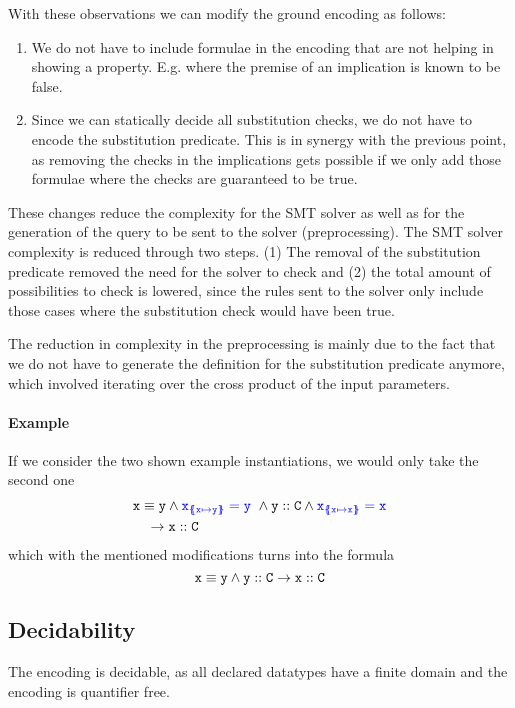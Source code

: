 \documentclass[a4paper]{article}
\begin{document}
With these observations we can modify the ground encoding as follows:
\begin{enumerate}
  \item We do not have to include formulae in the encoding that are not helping in showing a property.
        E.g. where the premise of an implication is known to be false.
  \item Since we can statically decide all substitution checks,
        we do not have to encode the substitution predicate.
        This is in synergy with the previous point,
        as removing the checks in the implications gets possible
        if we only add those formulae where the checks
        are guaranteed to be true.
\end{enumerate}

These changes reduce the complexity for the SMT solver as well as for the
generation of the query to be sent to the solver (preprocessing).
The SMT solver complexity is reduced through two steps.
(1) The removal of the substitution predicate removed the need for
the solver to check and
(2) the total amount of possibilities to check is lowered,
since the rules sent to the solver only include those cases where the
substitution check would have been true.

The reduction in complexity in the preprocessing is mainly due to the fact
that we do not have to generate the definition for the substitution predicate anymore,
which involved iterating over the cross product of the input parameters.

\paragraph{Example}
If we consider the two shown example instantiations, we would only take the second one
\begin{align*}
  &\mathit{\mathtt{x}} \equiv \mathit{\mathtt{y}} \land
   {\color{blue}\ensuremath{\mathtt{x}_{\{\mskip-6.9mu\{ \mathtt{x} \mapsto \mathtt{y} \}\mskip-6.9mu\}}}=\mathtt{y}}~\land
   \mathit{\mathtt{y}} :: \mathit{\mathtt{C}} \land
   {\color{blue}\ensuremath{\mathtt{x}_{\{\mskip-6.9mu\{ \mathtt{x} \mapsto \mathtt{x} \}\mskip-6.9mu\}}}=\mathtt{x}}\\
  &\quad \rightarrow \mathit{\mathtt{x}} :: \mathit{\mathtt{C}}
\end{align*}
which with the mentioned modifications turns into the formula
\[
  \mathit{\mathtt{x}} \equiv \mathit{\mathtt{y}} \land \mathit{\mathtt{y}} :: \mathit{\mathtt{C}} \rightarrow \mathit{\mathtt{x}} :: \mathit{\mathtt{C}}
\]

\subsection{Decidability}
The encoding is decidable,
as all declared datatypes have a finite domain
and the encoding is quantifier free.
\end{document}
